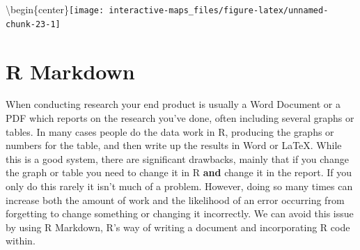 \documentclass[
  12pt,
]{book}
\newenvironment{Shaded}{\begin{snugshade}}{\end{snugshade}}
\newcommand{\DataTypeTok}[1]{\textcolor[rgb]{0.13,0.29,0.53}{#1}}
\newcommand{\DecValTok}[1]{\textcolor[rgb]{0.00,0.00,0.81}{#1}}
\newcommand{\KeywordTok}[1]{\textcolor[rgb]{0.13,0.29,0.53}{\textbf{#1}}}
\newcommand{\NormalTok}[1]{#1}
\newcommand{\OperatorTok}[1]{\textcolor[rgb]{0.81,0.36,0.00}{\textbf{#1}}}
\newcommand{\StringTok}[1]{\textcolor[rgb]{0.31,0.60,0.02}{#1}}
\begin{document}
\begin{Shaded}
\end{Shaded}

\textbackslash begin\{center\}\texttt{[image: interactive-maps\_files/figure-latex/unnamed-chunk-23-1]}

\hypertarget{r-markdown}{%
\chapter{R Markdown}\label{r-markdown}}

When conducting research your end product is usually a Word Document or a PDF which reports on the research you've done, often including several graphs or tables. In many cases people do the data work in R, producing the graphs or numbers for the table, and then write up the results in Word or LaTeX. While this is a good system, there are significant drawbacks, mainly that if you change the graph or table you need to change it in R \textbf{and} change it in the report. If you only do this rarely it isn't much of a problem. However, doing so many times can increase both the amount of work and the likelihood of an error occurring from forgetting to change something or changing it incorrectly. We can avoid this issue by using R Markdown, R's way of writing a document and incorporating R code within.
\end{document}
